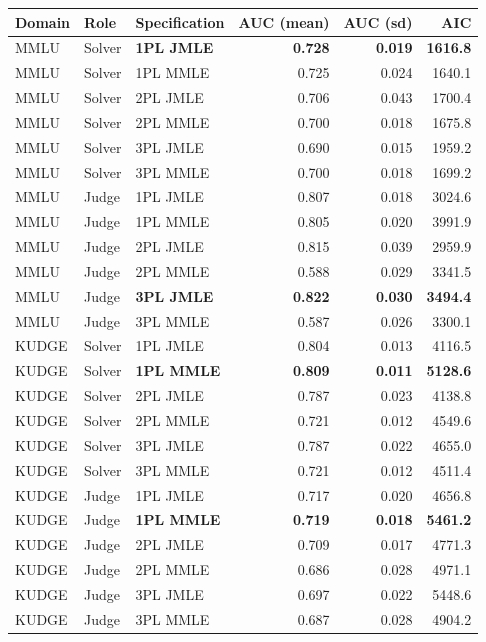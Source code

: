 \begin{table}[t]
\centering
\small
\begin{tabular}{lllrrr}
\toprule
Domain & Role & Specification & AUC (mean) & AUC (sd) & AIC \\
\midrule
MMLU & Solver & \textbf{1PL JMLE} & \textbf{0.728} & \textbf{0.019} & \textbf{1616.8} \\
MMLU & Solver & 1PL MMLE & 0.725 & 0.024 & 1640.1 \\
MMLU & Solver & 2PL JMLE & 0.706 & 0.043 & 1700.4 \\
MMLU & Solver & 2PL MMLE & 0.700 & 0.018 & 1675.8 \\
MMLU & Solver & 3PL JMLE & 0.690 & 0.015 & 1959.2 \\
MMLU & Solver & 3PL MMLE & 0.700 & 0.018 & 1699.2 \\
MMLU & Judge & 1PL JMLE & 0.807 & 0.018 & 3024.6 \\
MMLU & Judge & 1PL MMLE & 0.805 & 0.020 & 3991.9 \\
MMLU & Judge & 2PL JMLE & 0.815 & 0.039 & 2959.9 \\
MMLU & Judge & 2PL MMLE & 0.588 & 0.029 & 3341.5 \\
MMLU & Judge & \textbf{3PL JMLE} & \textbf{0.822} & \textbf{0.030} & \textbf{3494.4} \\
MMLU & Judge & 3PL MMLE & 0.587 & 0.026 & 3300.1 \\
KUDGE & Solver & 1PL JMLE & 0.804 & 0.013 & 4116.5 \\
KUDGE & Solver & \textbf{1PL MMLE} & \textbf{0.809} & \textbf{0.011} & \textbf{5128.6} \\
KUDGE & Solver & 2PL JMLE & 0.787 & 0.023 & 4138.8 \\
KUDGE & Solver & 2PL MMLE & 0.721 & 0.012 & 4549.6 \\
KUDGE & Solver & 3PL JMLE & 0.787 & 0.022 & 4655.0 \\
KUDGE & Solver & 3PL MMLE & 0.721 & 0.012 & 4511.4 \\
KUDGE & Judge & 1PL JMLE & 0.717 & 0.020 & 4656.8 \\
KUDGE & Judge & \textbf{1PL MMLE} & \textbf{0.719} & \textbf{0.018} & \textbf{5461.2} \\
KUDGE & Judge & 2PL JMLE & 0.709 & 0.017 & 4771.3 \\
KUDGE & Judge & 2PL MMLE & 0.686 & 0.028 & 4971.1 \\
KUDGE & Judge & 3PL JMLE & 0.697 & 0.022 & 5448.6 \\
KUDGE & Judge & 3PL MMLE & 0.687 & 0.028 & 4904.2 \\

\end{tabular}
\end{table}
